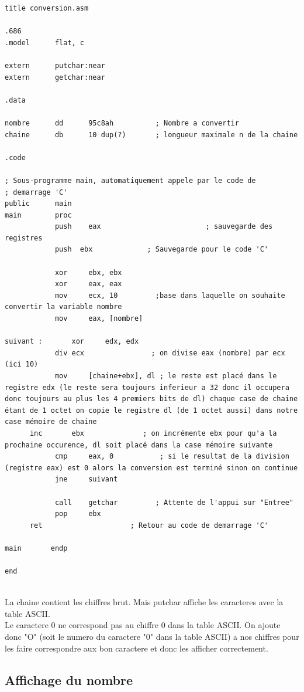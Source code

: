 \documentclass[11pt]{report}
\begin{document}
\begin{lstlisting}
title conversion.asm

.686
.model 		flat, c

extern      putchar:near
extern      getchar:near

.data

nombre      dd      95c8ah          ; Nombre a convertir
chaine      db      10 dup(?)       ; longueur maximale n de la chaine

.code

; Sous-programme main, automatiquement appele par le code de
; demarrage 'C'
public      main
main        proc
			push 	eax							; sauvegarde des registres
			push  ebx             ; Sauvegarde pour le code 'C'

			xor		ebx, ebx
			xor		eax, eax
			mov		ecx, 10         ;base dans laquelle on souhaite convertir la variable nombre
			mov		eax, [nombre]

suivant :		xor 	edx, edx
			div	ecx                ; on divise eax (nombre) par ecx (ici 10)
			mov		[chaine+ebx], dl ; le reste est placé dans le registre edx (le reste sera toujours inferieur a 32 donc il occupera donc toujours au plus les 4 premiers bits de dl) chaque case de chaine étant de 1 octet on copie le registre dl (de 1 octet aussi) dans notre case mémoire de chaine
      inc		ebx              ; on incrémente ebx pour qu'a la prochaine occurence, dl soit placé dans la case mémoire suivante
			cmp		eax, 0           ; si le resultat de la division (registre eax) est 0 alors la conversion est terminé sinon on continue
			jne		suivant

			call    getchar         ; Attente de l'appui sur "Entree"
			pop     ebx
      ret                     ; Retour au code de demarrage 'C'

main       endp

end


\end{lstlisting}

La chaine contient les chiffres brut. Mais putchar affiche les caracteres avec la table ASCII.
\\Le caractere 0 ne correspond pas au chiffre 0 dans la table ASCII. On ajoute donc "O" (soit le numero du caractere "0" dans la table ASCII) a nos chiffres pour les faire correspondre aux bon caractere et donc les afficher correctement.

\subsection{Affichage du nombre}
\end{document}
